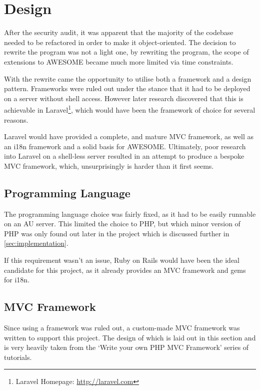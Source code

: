 \chapter{Design}
	
	After the security audit, it was apparent that the majority of the codebase needed to be refactored in order to make it object-oriented.
	The decision to rewrite the program was not a light one, by rewriting the program, the scope of extensions to \ac{AWESOME} became much more limited via time constraints.
	
	With the rewrite came the opportunity to utilise both a framework and a design pattern.
	Frameworks were ruled out under the stance that it had to be deployed on a server without shell access.
	However later research discovered that this is achievable in Laravel\footnote{Laravel Homepage: \url{http://laravel.com}}, which would have been the framework of choice for several reasons.
	
	Laravel would have provided a complete, and mature \ac{MVC} framework, as well as an \ac{i18n} framework and a solid basis for \ac{AWESOME}.
	Ultimately, poor research into Laravel on a shell-less server resulted in an attempt to produce a bespoke \ac{MVC} framework, which, unsurprisingly is harder than it first seems.
	
	\section{Programming Language}
	
	The programming language choice was fairly fixed, as it had to be easily runnable on an \ac{AU} server.
	This limited the choice to PHP, but which minor version of PHP was only found out later in the project which is discussed further in \autoref{sec:implementation}.
	
	If this requirement wasn't an issue, Ruby on Rails would have been the ideal candidate for this project, as it already provides an \ac{MVC} framework and gems for \ac{i18n}.
	
	\section{\acl{MVC} Framework}
	
	Since using a framework was ruled out, a custom-made \ac{MVC} framework was written to support this project.
	The design of which is laid out in this section and is very heavily taken from the `Write your own PHP MVC Framework' series of tutorials\cite{php-mvc-tutorial}.
	
